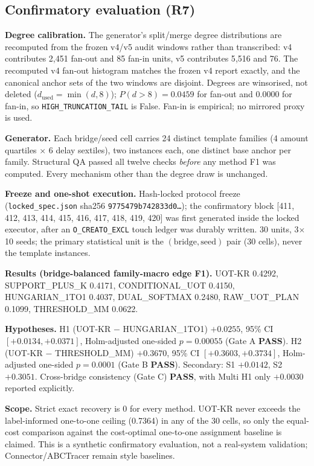 \subsection{Confirmatory evaluation (R7)}
\textbf{Degree calibration.} The generator's split/merge degree distributions are
recomputed from the frozen v4/v5 audit windows rather than transcribed: v4 contributes
2{,}451 fan-out and 85 fan-in units, v5 contributes 5{,}516 and 76. The recomputed v4
fan-out histogram matches the frozen v4 report exactly, and the canonical anchor sets of
the two windows are disjoint. Degrees are winsorised, not deleted
($d_{\mathrm{used}}=\min(d,8)$); $P(d>8)=0.0459$
for fan-out and 0.0000 for fan-in, so
\texttt{HIGH\_TRUNCATION\_TAIL} is False. Fan-in is empirical; no
mirrored proxy is used.

\textbf{Generator.} Each bridge/seed cell carries 24 distinct template families
(4 amount quartiles $\times$ 6 delay sextiles), two instances each, one distinct base
anchor per family. Structural QA passed all twelve checks \emph{before} any method F1 was
computed. Every mechanism other than the degree draw is unchanged.

\textbf{Freeze and one-shot execution.} Hash-locked protocol freeze
(\texttt{locked\_spec.json} sha256 \texttt{9775479b742833d0\ldots}); the confirmatory block
[411, 412, 413, 414, 415, 416, 417, 418, 419, 420] was first generated inside the locked executor, after an
\texttt{O\_CREAT\textbar{}O\_EXCL} touch ledger was durably written. 30 units,
3$\times$10 seeds; the primary statistical unit is the
$(\mathrm{bridge},\mathrm{seed})$ pair (30 cells), never the template instances.

\textbf{Results (bridge-balanced family-macro edge F1).} UOT-KR
0.4292, SUPPORT\_PLUS\_K
0.4171, CONDITIONAL\_UOT
0.4150, HUNGARIAN\_1TO1
0.4037, DUAL\_SOFTMAX
0.2480, RAW\_UOT\_PLAN
0.1099, THRESHOLD\_MM 0.0622.

\textbf{Hypotheses.} H1 (UOT-KR $-$ HUNGARIAN\_1TO1) $+0.0255$,
95\% CI $[+0.0134, +0.0371]$, Holm-adjusted one-sided
$p=0.00055$ (Gate A \textbf{PASS}). H2
(UOT-KR $-$ THRESHOLD\_MM) $+0.3670$,
95\% CI $[+0.3603, +0.3734]$, Holm-adjusted one-sided
$p=0.0001$ (Gate B \textbf{PASS}).
Secondary: S1 $+0.0142$, S2 $+0.3051$.
Cross-bridge consistency (Gate C) \textbf{PASS},
with Multi H1 only $+0.0030$ reported explicitly.

\textbf{Scope.} Strict exact recovery is $0$ for every method. UOT-KR never exceeds the
label-informed one-to-one ceiling (0.7364) in any of the 30 cells,
so only the equal-cost comparison against the cost-optimal one-to-one assignment baseline
is claimed. This is a synthetic confirmatory evaluation, not a real-system validation;
Connector/ABCTracer remain style baselines.
